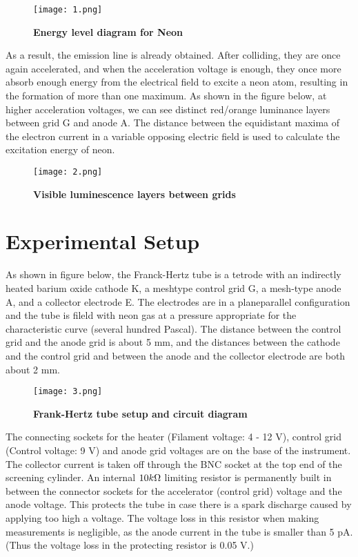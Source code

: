 	\begin{figure}[H]
		\centering
		\texttt{[image: 1.png]}
		\caption{\textbf{Energy level diagram for Neon}}
		\label{fig:1}
	\end{figure}

	As a result, the emission line is already obtained. After colliding, they are once again accelerated, and when the acceleration voltage is enough, they once more absorb enough energy from the electrical field to excite a neon atom, resulting in the formation of more than one maximum. As shown in the figure below, at higher acceleration voltages, we can see distinct red/orange luminance layers between grid G and anode A. The distance between the equidistant maxima of the electron current in a variable opposing electric field is used to calculate the excitation energy of neon.
	
	\begin{figure}[H]
		\centering
		\texttt{[image: 2.png]}
		\caption{\textbf{Visible luminescence layers between grids}}
		\label{fig:2}
	\end{figure}



\section{Experimental Setup}
	As shown in figure below, the Franck-Hertz tube is a tetrode with an indirectly heated barium oxide cathode K, a meshtype control grid G, a mesh-type anode A, and a collector electrode E. The electrodes are in a planeparallel configuration and the tube is fileld with neon gas at a pressure appropriate for the characteristic curve (several hundred Pascal). The distance between the control grid and the anode grid is about 5 mm, and the distances between the cathode and the control grid and between the anode and the collector electrode are both about 2 mm.
	
	\begin{figure}[H]
		\centering
		\texttt{[image: 3.png]}
		\caption{\textbf{Frank-Hertz tube setup and circuit diagram}}
		\label{fig:3}
	\end{figure}

	The connecting sockets for the heater (Filament voltage: 4 - 12 V), control grid (Control voltage: 9 V) and anode grid voltages are on the base of the instrument. The collector current is taken off through the BNC socket at the top end of the screening cylinder. An internal $10k\ohm$ limiting resistor is permanently built in between the connector sockets for the accelerator (control grid) voltage and the anode voltage. This protects the tube in case there is a spark discharge caused by applying too high a voltage. The voltage loss in this resistor when making measurements is negligible, as the anode current in the tube is smaller than 5 pA. (Thus the voltage loss in the protecting resistor is 0.05 V.)
